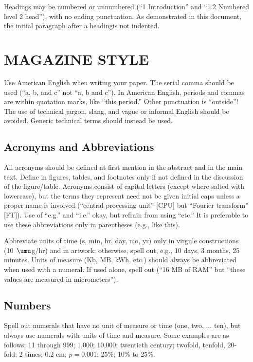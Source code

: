 \documentclass{IEEEmce}
\begin{document}
Headings may be numbered or unnumbered (``1 Introduction'' and ``1.2 Numbered level 2 head''), with no ending punctuation. As demonstrated in this document, the initial paragraph after a headingis not indented.

\section{MAGAZINE STYLE}

Use American English when writing your paper. The serial comma should be used (``a, b, and c'' not ``a, b and c''). In American English, periods and commas are within quotation marks, like ``this period.'' Other punctuation is ``outside''! The use of technical jargon, slang, and vague or informal English should be avoided. Generic technical terms should instead be used.

\subsection{Acronyms and Abbreviations}

All acronyms should be defined at first mention in the abstract and in the main text. Define in figures, tables, and footnotes only if not defined in the discussion of the figure/table. Acronyms consist of capital letters (except where salted with lowercase), but the terms they represent need not be given initial caps unless a proper name is involved (``central processing unit'' [CPU] but ``Fourier transform'' [FT]). Use of ``e.g.'' and ``i.e.'' okay, but refrain from using ``etc.'' It is preferable to use these abbreviations only in parentheses (e.g., like this).

Abbreviate units of time (s, min, hr, day, mo, yr) only in virgule constructions (10~$\umu$g/hr) and in artwork; otherwise, spell out, e.g., 10 days, 3 months, 25 minutes. Units of measure (Kb, MB, kWh, etc.) should always be abbreviated when used with a numeral. If used alone, spell out (``16 MB of RAM'' but ``these values are measured in micrometers'').

\subsection{Numbers}

Spell out numerals that have no unit of measure or time (one, two, $\ldots$ ten), but always use numerals with units of time and measure. Some examples are as follows: 11 through 999; 1,000; 10,000; twentieth century; twofold, tenfold, 20-fold; 2 times; 0.2 cm; $p = 0.001$; 25\%; 10\% to 25\%.
\end{document}
